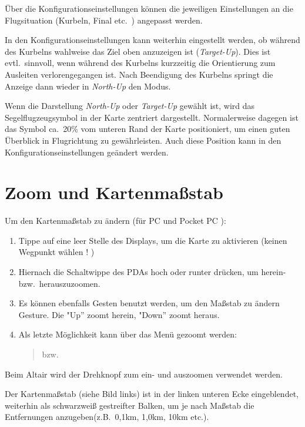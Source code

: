 Über die Konfigurationseinstellungen  können die jeweiligen Einstellungen an die Flugsituation (Kurbeln, Final etc.\  ) angepasst werden.

In den Konfigurationseinstellungen kann weiterhin eingestellt werden, ob während des Kurbelns wahlweise das Ziel oben anzuzeigen ist (\emph{Target-Up}). Dies ist evtl.\ sinnvoll, wenn während des Kurbelns kurzzeitig die Orientierung zum Ausleiten verlorengegangen ist. Nach Beendigung des Kurbelns springt die Anzeige dann wieder in \emph{North-Up} den Modus.

Wenn die Darstellung \emph{North-Up} oder \emph{Target-Up} gewählt ist, wird das Segelflugzeugsymbol in der Karte zentriert dargestellt. Normalerweise dagegen ist das Symbol ca.\ 20\% vom unteren Rand der Karte positioniert, um einen guten Überblick in Flugrichtung zu gewährleisten. Auch diese Position kann in den Konfigurationseinstellungen geändert werden.
\section{Zoom und Kartenmaßstab}\label{zoom}\label{kartenmasstab}
Um den Kartenmaßstab zu ändern  (für \textsf{PC}  und  \textsf{Pocket PC} ):
\begin{enumerate}
  \item Tippe auf eine leer Stelle des Displays, um die Karte zu aktivieren (keinen Wegpunkt wählen ! )
  \item Hiernach die Schaltwippe des \textsf{PDA}s hoch oder runter drücken, um herein- bzw.\ herauszuzoomen.
  \item Es können ebenfalls Gesten benutzt werden, um den Maßstab zu ändern Gesture.
      Die  
     "Up'' zoomt herein,  "Down'' zoomt heraus.
     \item Als letzte Möglichkeit kann über das Menü gezoomt werden:
\begin{quote}
 \blink{} bzw. \blink{}
\end{quote}
\end{enumerate}

Beim Altair wird der Drehknopf zum ein- und auszoomen verwendet werden.

Der Kartenmaßstab (siehe Bild links)  ist in der linken unteren Ecke eingeblendet, weiterhin als schwarzweiß 
gestreifter Balken, um je nach Maßstab die Entfernungen anzugeben(z.B.\ 0,1km, 1,0km, 10km etc.).

